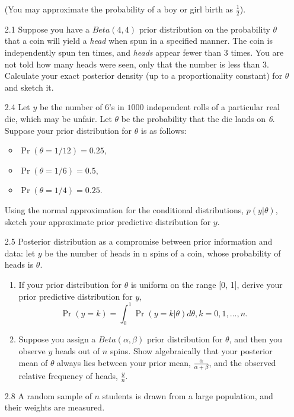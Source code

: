 \documentclass[12pt,a4paper,twoside]{article}
\begin{document}
\begin{enumerate}
    (You may approximate the probability of a boy or girl birth as $\frac{1}{2}$).
    \item[2.1]\cite{Chapter2Exercises} Suppose you have a $Beta(4, 4)$ prior distribution on the probability $\theta$ that a coin will yield
    a \textit{head} when spun in a specified manner. The coin is independently spun ten times, and \textit{heads} appear fewer than 3 times.
    You are not told how many heads were seen, only that the number is less than 3. Calculate your exact posterior density (up to a
    proportionality constant) for $\theta$ and sketch it.
    \item[2.4]\cite{Chapter2Exercises} Let $y$ be the number of 6's in $1000$ independent rolls of a particular real die, which may be unfair.
    Let $\theta$ be the probability that the die lands on \textit{6}. Suppose your prior distribution for $\theta$ is as follows:
    \begin{itemize} 
        \item $\Pr(\theta = 1/12) = 0.25$,
        \item $\Pr(\theta = 1/6) = 0.5$,
        \item $\Pr(\theta = 1/4) = 0.25$.
    \end{itemize}
    Using the normal approximation for the conditional distributions, $p(y|\theta)$, sketch your approximate prior predictive distribution
    for $y$.
    \item[2.5]\cite{Chapter2Exercises} Posterior distribution as a compromise between prior information and data: let $y$ be the number of
    heads in n spins of a coin, whose probability of heads is $\theta$.
    \begin{enumerate}[label=$\alph*)$]
        \item If your prior distribution for $\theta$ is uniform on the range [0, 1], derive your prior predictive distribution for $y$,
        \[
        \Pr(y = k) = \int_{0}^{1} \Pr(y = k|\theta) d\theta, k = 0, 1, . . . , n.
        \]
        \item Suppose you assign a $Beta(\alpha, \beta)$ prior distribution for $\theta$, and then you observe $y$ heads
        out of $n$ spins. Show algebraically that your posterior mean of $\theta$ always lies between your prior mean,
        $\frac{\alpha}{\alpha + \beta}$, and the observed relative frequency of heads, $\frac{y}{n}$.
    \end{enumerate}
    \item[2.8]\cite{Chapter2Exercises} A random sample of $n$ students is drawn from a large population, and their weights are measured.

\end{enumerate}
\end{document}
